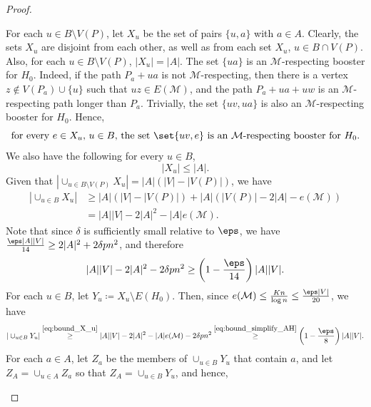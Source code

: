 \documentclass[10pt,a4paper,reqno]{amsart}
\begin{document}
\begin{proof}
\begin{claimproof}
For each $u \in B \setminus V(P)$, let $X_u$ be the set of pairs $\{u, a\}$ with $a \in A$. Clearly, the sets $X_u$ are disjoint from each other, as well as from each set $X_u$, $u \in B \cap V(P)$. Also, for each $u \in B \setminus V(P)$, $|X_u| = |A|$. The set $\{ua\}$ is an $\mathcal{M}$-respecting booster for $H_0$. Indeed, if the path $P_a + ua$ is not $\mathcal{M}$-respecting, then there is a vertex $z \not\in V(P_a) \cup \{u\}$ such that $uz \in E(\mathcal{M})$, and the path $P_a + ua + uw$ is an $\mathcal{M}$-respecting path longer than $P_a$. Trivially, the set $\{uv, ua\}$ is also an $\mathcal{M}$-respecting booster for $H_0$. Hence,
\begin{equation}\label{eq:X-is-a-set-of-boosters}
    \text{for every~}e \in X_u \text{,~} u\in B \text{, the set~} \set{uv, e} \text{~is an $\mathcal{M}$-respecting booster for~} H_0.
\end{equation}
We also have the following for every $u \in B$,
\begin{equation}\label{eq:x_u-at-most-A}
    |X_u| \leq |A|.
\end{equation}
Given that $|\cup_{u \in B\setminus V(P)} X_u| = |A|\left( |V| - |V(P)| \right)$, we have
\begin{align}\label{eq:bound_X_u}
    |\cup_{u \in B} X_u| &\geq |A| \left( |V| - |V(P)| \right) + |A| \left( |V(P)| - 2|A| - e(\mathcal{M}) \right) \nonumber \\
    &= |A||V| - 2|A|^2 - |A|e(\mathcal{M}).
\end{align}
Note that since $\delta$ is sufficiently small relative to $\eps$, we have $\frac{\eps |A||V|}{14} \geq 2|A|^2 + 2\delta p n^2$, and therefore
\begin{equation}\label{eq:bound_simplify_AH}
    |A||V| - 2|A|^2 - 2\delta p n^2 \geq \left( 1 - \frac{\eps}{14} \right) |A||V|.
\end{equation}
For each $u \in B$, let $Y_u \coloneqq X_u \setminus E(H_0)$. Then, since $e(\mathcal{M}) \leq \frac{Kn}{\log n} \leq \frac{\eps |V|}{20}$, we have
\begin{equation}\label{eq:bound_Y_u}
    |\cup_{u \in B} Y_u| \stackrel{\eqref{eq:bound_X_u}}{\geq} |A| |V| - 2|A|^2 - |A|e(\mathcal{M}) - 2\delta p n^2 \stackrel{\eqref{eq:bound_simplify_AH}}{\geq} \left(1 - \frac{\eps}{8}\right)|A||V|.
\end{equation}
For each $a \in A$, let $Z_a$ be the members of $\cup_{u \in B} Y_u$ that contain $a$, and let $Z_A = \cup_{u \in A} Z_a$ so that $Z_A = \cup_{u \in B} Y_u$, and hence,
\begin{equation}\label{eq:size_ZA}

\end{equation}
\end{claimproof}
\end{proof}
\end{document}
